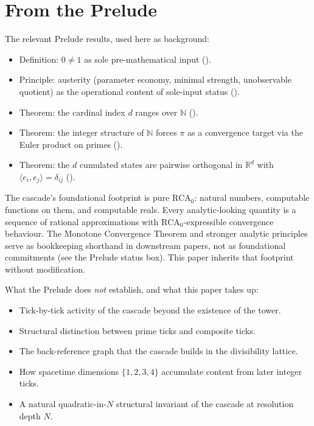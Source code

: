 \documentclass[11pt,a4paper]{article}
\begin{document}
\section{From the Prelude}\label{sec:from-the-prelude}

The relevant Prelude results, used here as background:

\begin{itemize}
\item Definition: $0 \neq 1$ as sole pre-mathematical input
().
\item Principle: austerity (parameter economy, minimal strength,
unobservable quotient) as the operational content of sole-input
status ().
\item Theorem: the cardinal index $d$ ranges over $\mathbb{N}$
().
\item Theorem: the integer structure of $\mathbb{N}$ forces $\pi$ as
a convergence target via the Euler product on primes
().
\item Theorem: the $d$ cumulated states are pairwise orthogonal in
$\mathbb{R}^d$ with $\langle e_i, e_j \rangle = \delta_{ij}$
().
\end{itemize}

\noindent The cascade's foundational footprint is pure
$\mathrm{RCA}_0$: natural numbers, computable functions on them, and
computable reals. Every analytic-looking quantity is a sequence of
rational approximations with $\mathrm{RCA}_0$-expressible convergence
behaviour. The Monotone Convergence Theorem and stronger analytic
principles serve as bookkeeping shorthand in downstream papers, not
as foundational commitments (see the Prelude status box). This paper
inherits that footprint without modification.

What the Prelude does \emph{not} establish, and what this paper
takes up:

\begin{itemize}
\item Tick-by-tick activity of the cascade beyond the existence
of the tower.
\item Structural distinction between prime ticks and composite ticks.
\item The back-reference graph that the cascade builds in the
divisibility lattice.
\item How spacetime dimensions $\{1, 2, 3, 4\}$ accumulate content
from later integer ticks.
\item A natural quadratic-in-$N$ structural invariant of the cascade
at resolution depth $N$.
\end{itemize}
\end{document}
